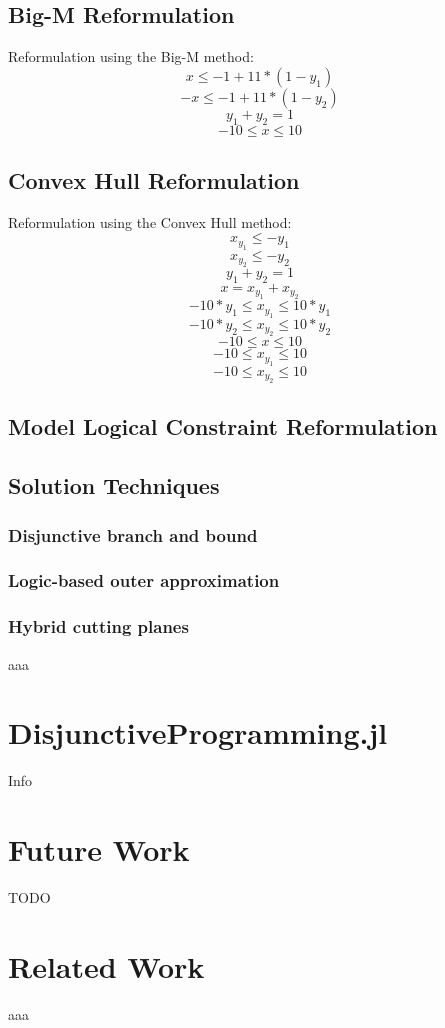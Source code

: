 \documentclass{juliacon}
\begin{document}
\subsection{Big-M Reformulation}
Reformulation using the Big-M method:
\[ x \leq -1 + 11 * (1 - y_1) \]
\[-x \leq -1 + 11 * (1 - y_2) \]
\[y_1 + y_2 = 1 \]
\[-10 \leq x \leq 10\]

\subsection{Convex Hull Reformulation}
Reformulation using the Convex Hull method:
\[x_{y_1} \leq -y_1 \]
\[x_{y_2} \leq -y_2\]
\[y_1 + y_2 = 1\]
\[x = x_{y_1} + x_{y_2}\]
\[-10 * y_1 \leq x_{y_1} \leq 10 * y_1\]
\[-10 * y_2 \leq x_{y_2} \leq 10 * y_2\]
\[-10 \leq x \leq 10\]
\[-10 \leq x_{y_1} \leq 10\]
\[-10 \leq x_{y_2} \leq 10\]

\subsection{Model Logical Constraint Reformulation}

\subsection{Solution Techniques}
\subsubsection{Disjunctive branch and bound}
\subsubsection{Logic-based outer approximation}
\subsubsection{Hybrid cutting planes}
aaa

\section{DisjunctiveProgramming.jl}
\label{sec:documentclass}
Info

\section{Future Work}
TODO

\section{Related Work}
aaa
\end{document}
